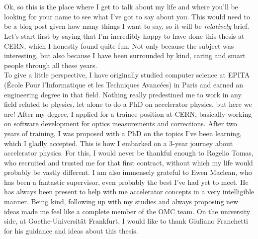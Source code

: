 \chapter{}


{
\fontsize{\fontsizeabstract}{\fontskipabstract}\selectfont

Ok, so this is the place where I get to talk about my life and where you'll be looking for your name
to see what I've got to say about you. This would need to be a blog post given how many things I
want to say, so it will be \textit{relatively} brief.
Let's start first by saying that I'm incredibly happy to have done this thesis at CERN, which I
honestly found quite fun. Not only because the subject was interesting, but also because I have been
surrounded by kind, caring and smart people through all these years.\\
\indent
To give a little perspective, I have originally studied computer science at EPITA (École Pour
l'Informatique et les Techniques Avancées) in Paris and earned an engineering degree in that field.
Nothing really predestined me to work in any field related to physics, let alone to do a PhD on 
accelerator physics, but here we are! After my degree, I applied for a trainee position at CERN, 
basically working on software development for optics measurements and corrections. After two years
of training, I was proposed with a PhD on the topics I've been learning, which I gladly accepted.
This is how I embarked on a 3-year journey about accelerator physics. For this, I would never be 
thankful enough to Rogelio Tomas, who recruited and trusted me for that first contract, without
which my life would probably be vastly different.
I am also immensely grateful to Ewen Maclean, who has been a fantastic supervisor, even probably the
best I've had yet to meet. He has always been present to help with me accelerator concepts in a very
intelligible manner. Being kind, following up with my studies and always proposing new ideas made me
feel like a complete member of the OMC team. On the university side, at Goethe-Universität
Frankfurt, I would like to thank Giuliano Franchetti for his guidance and ideas about this thesis.

}
